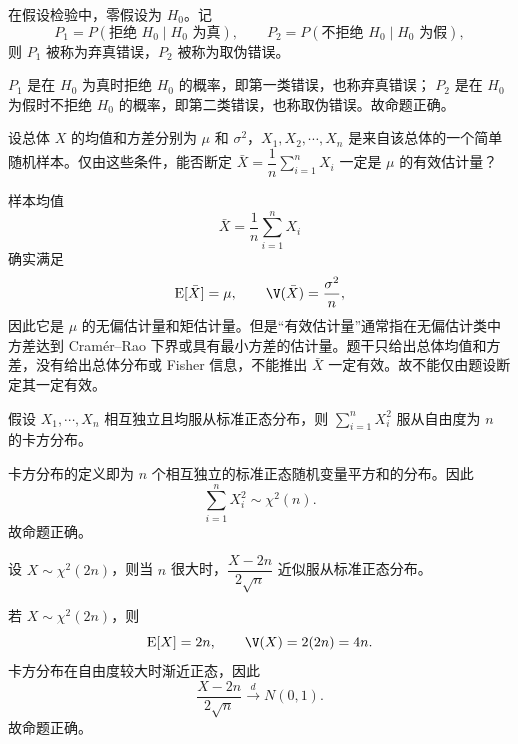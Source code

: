 
\begin{question}
在假设检验中，零假设为 $H_0$。记
\[
P_1=P(\text{拒绝 }H_0\mid H_0\text{ 为真}),
\qquad
P_2=P(\text{不拒绝 }H_0\mid H_0\text{ 为假}),
\]
则 $P_1$ 被称为弃真错误，$P_2$ 被称为取伪错误。
\begin{solution}
$P_1$ 是在 $H_0$ 为真时拒绝 $H_0$ 的概率，即第一类错误，也称弃真错误；
$P_2$ 是在 $H_0$ 为假时不拒绝 $H_0$ 的概率，即第二类错误，也称取伪错误。故命题正确。
\end{solution}
\end{question}

\begin{question}
设总体 $X$ 的均值和方差分别为 $\mu$ 和 $\sigma^2$，$X_1,X_2,\cdots,X_n$ 是来自该总体的一个简单随机样本。仅由这些条件，能否断定 $\bar X=\dfrac1n\sum_{i=1}^n X_i$ 一定是 $\mu$ 的有效估计量？
\begin{solution}
样本均值
\[
\bar X=\frac1n\sum_{i=1}^nX_i
\]
确实满足
\[
\operatorname{E}[\bar X]=\mu,
\qquad
\V(\bar X)=\frac{\sigma^2}{n},
\]
因此它是 $\mu$ 的无偏估计量和矩估计量。但是“有效估计量”通常指在无偏估计类中方差达到 Cram\'er--Rao 下界或具有最小方差的估计量。题干只给出总体均值和方差，没有给出总体分布或 Fisher 信息，不能推出 $\bar X$ 一定有效。故不能仅由题设断定其一定有效。
\end{solution}
\end{question}

\begin{question}
假设 $X_1,\cdots,X_n$ 相互独立且均服从标准正态分布，则 $\sum_{i=1}^nX_i^2$ 服从自由度为 $n$ 的卡方分布。
\begin{solution}
卡方分布的定义即为 $n$ 个相互独立的标准正态随机变量平方和的分布。因此
\[
\sum_{i=1}^nX_i^2\sim \chi^2(n).
\]
故命题正确。
\end{solution}
\end{question}

\begin{question}
设 $X\sim\chi^2(2n)$，则当 $n$ 很大时，$\dfrac{X-2n}{2\sqrt n}$ 近似服从标准正态分布。
\begin{solution}
若 $X\sim\chi^2(2n)$，则
\[
\operatorname{E}[X]=2n,
\qquad
\V(X)=2(2n)=4n.
\]
卡方分布在自由度较大时渐近正态，因此
\[
\frac{X-2n}{2\sqrt n}\xrightarrow[]{d}N(0,1).
\]
故命题正确。
\end{solution}
\end{question}


